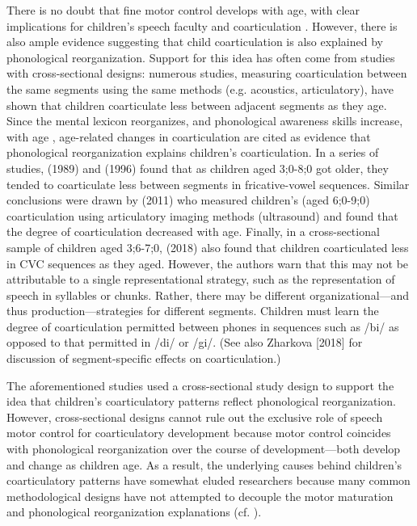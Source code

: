 \documentclass[a4paper,man,natbib,donotrepeattitle, apacite]{apa6}
\begin{document}
There is no doubt that fine motor control develops with age, with clear implications for children’s speech faculty and coarticulation \cite{barbierWhatAnticipatoryCoarticulation2020,zharkovaDynamicsVoicelessSibilant2018}. However, there is also ample evidence suggesting that child coarticulation is also explained by phonological reorganization. Support for this idea has often come from studies with cross-sectional designs: numerous studies, measuring coarticulation between the same segments using the same methods (e.g. acoustics, articulatory), have shown that children coarticulate less between adjacent segments as they age. Since the mental lexicon reorganizes, and phonological awareness skills increase, with age \cite{metsalaYoungChildrenPhonological1999,storkelInfluencePartwordPhonotactic2011}, age-related changes in coarticulation are cited as evidence that phonological reorganization explains children's coarticulation. In a series of studies, \citeauthor{nittrouerEmergencePhoneticSegments1989} (1989) and \citeauthor{nittrouerHowChildrenLearn1996} (1996) found that as children aged 3;0-8;0 got older, they tended to coarticulate less between segments in fricative-vowel sequences. Similar conclusions were drawn by \citeauthor{zharkovaCoarticulationIndicatorSpeech2011} (2011) who measured children’s (aged 6;0-9;0) coarticulation using articulatory imaging methods (ultrasound) and found that the degree of coarticulation decreased with age. Finally, in a cross-sectional sample of children aged 3;6-7;0, \citeauthor{noirayHowChildrenOrganize2018} (2018) also found that children coarticulated less in CVC sequences as they aged. However, the authors warn that this may not be attributable to a single representational strategy, such as the representation of speech in syllables or chunks. Rather, there may be different organizational---and thus production---strategies for different segments. Children must learn the degree of coarticulation permitted between phones in sequences such as /bi/ as opposed to that permitted in /di/ or /gi/. (See also Zharkova [2018] for discussion of segment-specific effects on coarticulation.) 

The aforementioned studies used a cross-sectional study design to support the idea that children’s coarticulatory patterns reflect phonological reorganization. However, cross-sectional designs cannot rule out the exclusive role of speech motor control for coarticulatory development because motor control coincides with phonological reorganization over the course of development---both develop and change as children age. As a result, the underlying causes behind children’s coarticulatory patterns have somewhat eluded researchers because many common methodological designs have not attempted to decouple the motor maturation and phonological reorganization explanations (cf. ).
\end{document}
